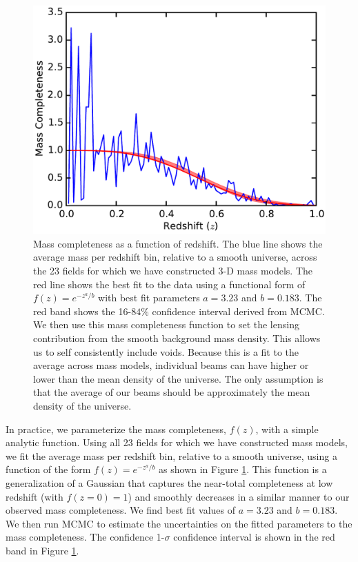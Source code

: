 \documentclass{emulateapj}
\begin{document}
\begin{figure}[t]
\begin{center}
\includegraphics[width=\columnwidth]{mass_completeness.pdf}
\caption{\label{fig:mass_complete} Mass completeness as a function of redshift. The blue line shows the average mass per redshift bin, relative to a smooth universe, across the 23 fields for which we have constructed 3-D mass models. The red line shows the best fit to the data using a functional form of $f(z) = e^{-z^a / b}$ with best fit parameters $a = 3.23$ and $b = 0.183$. The red band shows the 16-$84\%$ confidence interval derived from MCMC. We then use this mass completeness function to set the lensing contribution from the smooth background mass density. This allows us to self consistently include voids. Because this is a fit to the average across mass models, individual beams can have higher or lower than the mean density of the universe. The only assumption is that the average of our beams should be approximately the mean density of the universe.
}
\end{center}
\end{figure}

In practice, we parameterize the mass completeness, $f(z)$, with a simple analytic function. Using all 23 fields for which we have constructed mass models, we fit the average mass per redshift bin, relative to a smooth universe, using a function of the form $f(z) = e^{-z^a / b}$ as shown in Figure \ref{fig:mass_complete}. This function is a generalization of a Gaussian that captures the near-total completeness at low redshift (with $f(z=0) = 1$) and smoothly decreases in a similar manner to our observed mass completeness. We find best fit values of $a = 3.23$ and $b = 0.183$. We then run MCMC \citep{emcee} to estimate the uncertainties on the fitted parameters to the mass completeness. The confidence 1-$\sigma$ confidence interval is shown in the red band in Figure \ref{fig:mass_complete}. 
\end{document}
